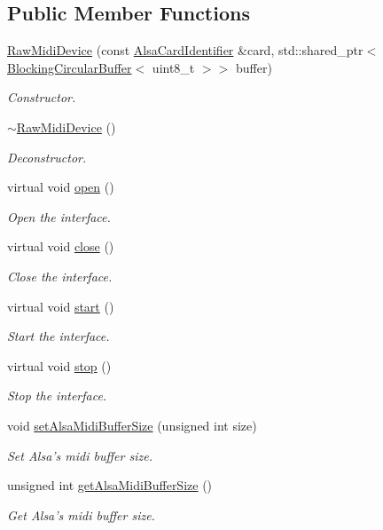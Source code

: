\subsection*{Public Member Functions}
\begin{DoxyCompactItemize}
\item 
\hyperlink{group__Midi_ga8be460b3e5b9b06cb21d1b47f7f488ab}{Raw\-Midi\-Device} (const \hyperlink{classNl_1_1AlsaCardIdentifier}{Alsa\-Card\-Identifier} \&card, std\-::shared\-\_\-ptr$<$ \hyperlink{classNl_1_1BlockingCircularBuffer}{Blocking\-Circular\-Buffer}$<$ uint8\-\_\-t $>$$>$ buffer)
\begin{DoxyCompactList}\small\item\em Constructor. \end{DoxyCompactList}\item 
\hyperlink{group__Midi_ga8ede83b60ff88f34a597952ea1bd32fb}{$\sim$\-Raw\-Midi\-Device} ()
\begin{DoxyCompactList}\small\item\em Deconstructor. \end{DoxyCompactList}\item 
virtual void \hyperlink{group__Midi_gace91f1137effd037eca8b3b959508f91}{open} ()
\begin{DoxyCompactList}\small\item\em Open the interface. \end{DoxyCompactList}\item 
virtual void \hyperlink{group__Midi_gaa66489de15df30f282637b8a1bcd263d}{close} ()
\begin{DoxyCompactList}\small\item\em Close the interface. \end{DoxyCompactList}\item 
virtual void \hyperlink{group__Midi_ga9ca4e486b5df388d9000ea8ef48d31a8}{start} ()
\begin{DoxyCompactList}\small\item\em Start the interface. \end{DoxyCompactList}\item 
virtual void \hyperlink{group__Midi_gae95fcc2ce4b3681d34f341b2d5c9276e}{stop} ()
\begin{DoxyCompactList}\small\item\em Stop the interface. \end{DoxyCompactList}\item 
void \hyperlink{group__Midi_gaf9dfa04b59e579eb3e4a24c8979bdc57}{set\-Alsa\-Midi\-Buffer\-Size} (unsigned int size)
\begin{DoxyCompactList}\small\item\em Set Alsa's midi buffer size. \end{DoxyCompactList}\item 
unsigned int \hyperlink{group__Midi_gad34ca9297599d1dc8113fded930263ce}{get\-Alsa\-Midi\-Buffer\-Size} ()
\begin{DoxyCompactList}\small\item\em Get Alsa's midi buffer size. \end{DoxyCompactList}\end{DoxyCompactItemize}
